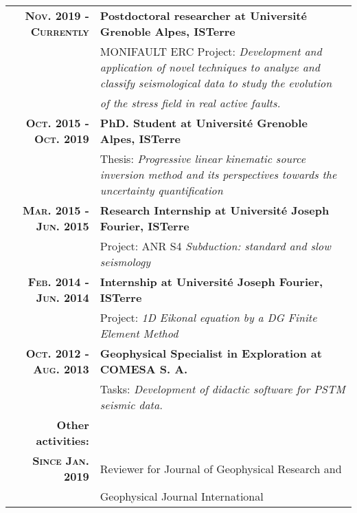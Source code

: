 \documentclass[a4paper,10.5pt]{article} %
\begin{document}
\begin{tabular}{rp{11cm}}

{\bf \textsc{Nov. 2019 - Currently }} & {\bf Postdoctoral researcher at Universit\'e Grenoble Alpes, ISTerre} \\
& MONIFAULT ERC Project: \emph{Development and application of novel techniques to analyze and classify seismological data to study the evolution} \\
& \emph{of the stress field in real active faults.}  \\[0.6em] 

{\bf \textsc{Oct. 2015 - Oct. 2019}} & {\bf PhD. Student at Universit\'e Grenoble Alpes, ISTerre} \\
& Thesis: \emph{Progressive linear kinematic source inversion
method and its perspectives towards the
uncertainty quantification} \\[0.6em] 

{\bf \textsc{Mar. 2015 - Jun. 2015}} & {\bf Research Internship at Universit\'e Joseph Fourier, ISTerre} \\
& Project:  ANR S4 \emph{Subduction: standard and slow seismology}\\[0.6em]

{\bf \textsc{Feb. 2014 - Jun. 2014}} & {\bf Internship at Universit\'e Joseph Fourier, ISTerre} \\
& Project: \emph{1D Eikonal equation by a DG Finite Element Method}\\[0.6em]

{\bf \textsc{Oct. 2012 - Aug. 2013}} & {\bf Geophysical Specialist in Exploration at \textsc{COMESA S. A.}} \\
& Tasks: \emph{Development of didactic software for PSTM seismic data.}\\[0.6em]
{\bf Other activities:}\\[0.6em]
{\bf \textsc{Since Jan.} 2019} & Reviewer for Journal of Geophysical Research and \\
			       & Geophysical Journal International\\[0.6em]
\end{tabular}
\end{document}
